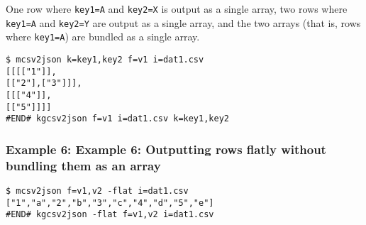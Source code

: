 One row where \verb|key1=A| and \verb|key2=X| is output as a single array, two rows where \verb|key1=A| and \verb|key2=Y| are output as a single array, and the two arrays (that is, rows where \verb|key1=A|) are bundled as a single array.


\begin{Verbatim}[baselinestretch=0.7,frame=single]
$ mcsv2json k=key1,key2 f=v1 i=dat1.csv
[[[["1"]],
[["2"],["3"]]],
[[["4"]],
[["5"]]]]
#END# kgcsv2json f=v1 i=dat1.csv k=key1,key2
\end{Verbatim}
\subsubsection*{Example 6: Example 6: Outputting rows flatly without bundling them as an array}



\begin{Verbatim}[baselinestretch=0.7,frame=single]
$ mcsv2json f=v1,v2 -flat i=dat1.csv
["1","a","2","b","3","c","4","d","5","e"]
#END# kgcsv2json -flat f=v1,v2 i=dat1.csv
\end{Verbatim}
